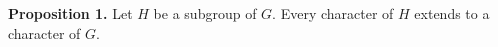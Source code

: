 \textbf{Proposition 1.} Let $H$ be a subgroup of $G$. Every character of $H$ extends to a character of $G$.
